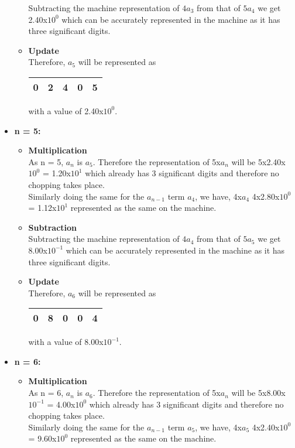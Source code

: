 \documentclass[letterpaper]{exam}
\begin{document}
\begin{questions}
\begin{parts}
\begin{solution}
\begin{itemize}
\begin{itemize}
Subtracting the machine representation of $4a_{3}$ from that of $5a_{4}$ we get 2.40x$10^0$ which can be accurately represented in the machine as it has three significant digits.
\item \textbf{Update}\\
Therefore, $a_{5}$ will be represented as \begin{tabular}{|c|c|c|c|c|}
\hline
     \huge{\color{red}0}&\huge{\color{green}2}&\huge{\color{green}4}&\huge{\color{green}0}&\huge{\color{yellow}5}  \\[0.5ex]
\hline
\end{tabular} with a value of 2.40x$10^0$.
\end{itemize}
\item \textbf{n = 5:}
\begin{itemize}
\item \textbf{Multiplication}\\
As n = 5, $a_{n}$ is $a_{5}$. Therefore the representation of 5x$a_{n}$ will be 5x2.40x$10^0$ = 1.20x$10^1$ which already has 3 significant digits and therefore no chopping takes place.\\
Similarly doing the same for the $a_{n-1}$ term $a_{4}$, we have, 4x$a_{4}$ 4x2.80x$10^0$ = 1.12x$10^1$ represented as the same on the machine.
\item \textbf{Subtraction}\\
Subtracting the machine representation of $4a_{4}$ from that of $5a_{5}$ we get 8.00x$10^{-1}$ which can be accurately represented in the machine as it has three significant digits.
\item \textbf{Update}\\
Therefore, $a_{6}$ will be represented as \begin{tabular}{|c|c|c|c|c|}
\hline
     \huge{\color{red}0}&\huge{\color{green}8}&\huge{\color{green}0}&\huge{\color{green}0}&\huge{\color{yellow}4}  \\[0.5ex]
\hline
\end{tabular} with a value of 8.00x$10^{-1}$.
\end{itemize}
\item \textbf{n = 6:}
\begin{itemize}
\item \textbf{Multiplication}\\
As n = 6, $a_{n}$ is $a_{6}$. Therefore the representation of 5x$a_{n}$ will be 5x8.00x$10^{-1}$ = 4.00x$10^0$ which already has 3 significant digits and therefore no chopping takes place.\\
Similarly doing the same for the $a_{n-1}$ term $a_{5}$, we have, 4x$a_{5}$ 4x2.40x$10^0$ = 9.60x$10^0$ represented as the same on the machine.

\end{itemize}
\end{itemize}
\end{solution}
\end{parts}
\end{questions}
\end{document}
